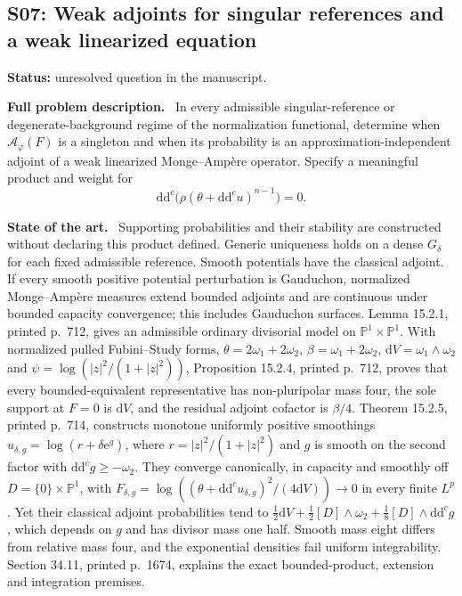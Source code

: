\documentclass[11pt]{article}
\newcommand{\ddc}{\mathrm d\mathrm d^c}
\newcommand{\field}[1]{\par\medskip\noindent\textbf{#1.}\ }
\begin{document}
\subsection{S07: Weak adjoints for singular references and a weak linearized equation}
\label{S07}
\noindent\textbf{Status:} unresolved question in the manuscript.
\field{Full problem description} In every admissible singular-reference or degenerate-background regime of the normalization functional, determine when $\mathcal A_\varphi(F)$ is a singleton and when its probability is an approximation-independent adjoint of a weak linearized Monge--Amp\`ere operator. Specify a meaningful product and weight for
\[\ddc\bigl(\rho(\theta+\ddc u)^{n-1}\bigr)=0.\]
\field{State of the art} Supporting probabilities and their stability are constructed without declaring this product defined. Generic uniqueness holds on a dense $G_\delta$ for each fixed admissible reference. Smooth potentials have the classical adjoint. If every smooth positive potential perturbation is Gauduchon, normalized Monge--Amp\`ere measures extend bounded adjoints and are continuous under bounded capacity convergence; this includes Gauduchon surfaces.
 Lemma 15.2.1, printed p.~712, gives an admissible ordinary divisorial model on $\mathbb P^1\times\mathbb P^1$. With normalized pulled Fubini--Study forms, $\theta=2\omega_1+2\omega_2$, $\beta=\omega_1+2\omega_2$, $\mathrm dV=\omega_1\wedge\omega_2$ and $\psi=\log(|z|^2/(1+|z|^2))$, Proposition 15.2.4, printed p.~712, proves that every bounded-equivalent representative has non-pluripolar mass four, the sole support at $F=0$ is $\mathrm dV$, and the residual adjoint cofactor is $\beta/4$. Theorem 15.2.5, printed p.~714, constructs monotone uniformly positive smoothings $u_{\delta,g}=\log(r+\delta\mathrm e^g)$, where $r=|z|^2/(1+|z|^2)$ and $g$ is smooth on the second factor with $\ddc g\geq-\omega_2$. They converge canonically, in capacity and smoothly off $D=\{0\}\times\mathbb P^1$, with $F_{\delta,g}=\log((\theta+\ddc u_{\delta,g})^2/(4\mathrm dV))\to0$ in every finite $L^p$. Yet their classical adjoint probabilities tend to $\tfrac12\mathrm dV+\tfrac12[D]\wedge\omega_2+\tfrac18[D]\wedge\ddc g$, which depends on $g$ and has divisor mass one half. Smooth mass eight differs from relative mass four, and the exponential densities fail uniform integrability. Section 34.11, printed p.~1674, explains the exact bounded-product, extension and integration premises.
\end{document}
